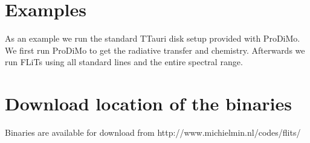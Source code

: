\documentclass[12pt]{article}
\begin{document}
\section{Examples}

As an example we run the standard TTauri disk setup provided with ProDiMo. We first run ProDiMo to get the radiative transfer and chemistry. Afterwards we run FLiTs using all standard lines and the entire spectral range.

\section{Download location of the binaries}

Binaries are available for download from http://www.michielmin.nl/codes/flits/
\end{document}
